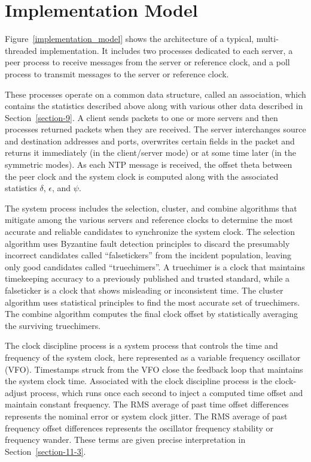 \chapter{Implementation Model}
\label{section-5}

Figure~\ref{implementation_model} shows the architecture of a typical, multi-threaded
implementation. It includes two processes dedicated to each server,
a peer process to receive messages from the server or reference
clock, and a poll process to transmit messages to the server or
reference clock.


These processes operate on a common data structure, called an
association, which contains the statistics described above along with
various other data described in Section~\ref{section-9}. A client sends packets to
one or more servers and then processes returned packets when they are
received. The server interchanges source and destination addresses
and ports, overwrites certain fields in the packet and returns it
immediately (in the client/server mode) or at some time later (in the
symmetric modes). As each NTP message is received, the offset theta
between the peer clock and the system clock is computed along with
the associated statistics $ \delta $, $ \epsilon $, and $ \psi $.

The system process includes the selection, cluster, and combine
algorithms that mitigate among the various servers and reference
clocks to determine the most accurate and reliable candidates to
synchronize the system clock. The selection algorithm uses Byzantine
fault detection principles to discard the presumably incorrect
candidates called ``falsetickers'' from the incident population,
leaving only good candidates called ``truechimers''. A truechimer is a
clock that maintains timekeeping accuracy to a previously published
and trusted standard, while a falseticker is a clock that shows
misleading or inconsistent time. The cluster algorithm uses
statistical principles to find the most accurate set of truechimers.
The combine algorithm computes the final clock offset by
statistically averaging the surviving truechimers.

The clock discipline process is a system process that controls the
time and frequency of the system clock, here represented as a
variable frequency oscillator (VFO). Timestamps struck from the VFO
close the feedback loop that maintains the system clock time.
Associated with the clock discipline process is the clock-adjust
process, which runs once each second to inject a computed time offset
and maintain constant frequency. The RMS average of past time offset
differences represents the nominal error or system clock jitter. The
RMS average of past frequency offset differences represents the
oscillator frequency stability or frequency wander. These terms are
given precise interpretation in Section~\ref{section-11-3}.

